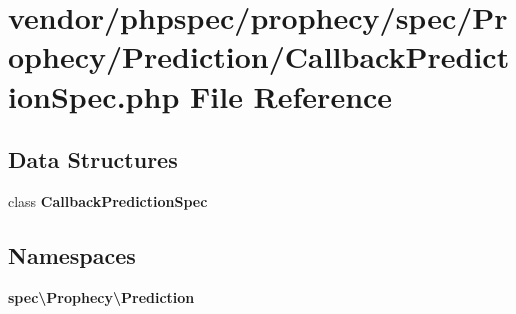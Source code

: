 \section{vendor/phpspec/prophecy/spec/\+Prophecy/\+Prediction/\+Callback\+Prediction\+Spec.php File Reference}
\label{_callback_prediction_spec_8php}
\subsection*{Data Structures}
\begin{DoxyCompactItemize}
\item 
class {\bf Callback\+Prediction\+Spec}
\end{DoxyCompactItemize}
\subsection*{Namespaces}
\begin{DoxyCompactItemize}
\item 
 {\bf spec\textbackslash{}\+Prophecy\textbackslash{}\+Prediction}
\end{DoxyCompactItemize}
